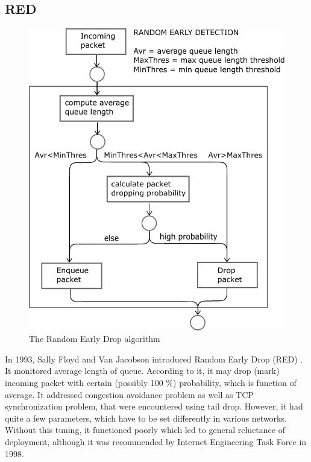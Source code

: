 \subsection{RED}


\begin{figure}
	\centering
	\includegraphics[width=137mm]{drawings/RED}
	\caption{The Random Early Drop algorithm \cite{RED:picture} }
	
	\label{fig04:RED}
\end{figure}

In 1993, Sally Floyd and Van Jacobson introduced Random Early Drop (RED) \cite{Floyd:1993:RED:169931.169935}. It monitored average length of queue. According to it, it may drop (mark) incoming packet with certain (possibly 100 \%) probability, which is function of average. It addressed congestion avoidance problem as well as TCP synchronization problem, that were encountered using tail drop. However, it had quite a few parameters, which have to be set differently in various networks. Without this tuning, it functioned poorly which led to general reluctance of deployment, although it was recommended by Internet Engineering Task Force \cite{rfc2309} in 1998.

